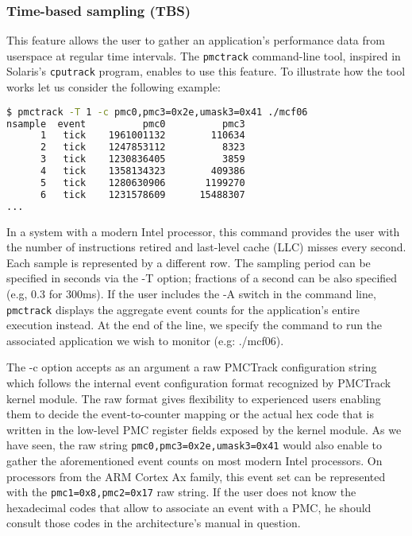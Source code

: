 \subsubsection{Time-based sampling (TBS)}\label{time-based-sampling-tbs}

This feature allows the user to gather an application's performance data
from userspace at regular time intervals. The \texttt{pmctrack}
command-line tool, inspired in Solaris's \texttt{cputrack} program,
enables to use this feature. To illustrate how the tool works let us
consider the following example:

\begin{lstlisting}[language=bash,basicstyle=\tt\scriptsize]
$ pmctrack -T 1 -c pmc0,pmc3=0x2e,umask3=0x41 ./mcf06
nsample  event          pmc0          pmc3
      1   tick    1961001132        110634
      2   tick    1247853112          8323
      3   tick    1230836405          3859
      4   tick    1358134323        409386
      5   tick    1280630906       1199270
      6   tick    1231578609      15488307
...
\end{lstlisting}

In a system with a modern Intel processor, this command provides the
user with the number of instructions retired and last-level cache (LLC)
misses every second. Each sample is represented by a different row. The
sampling period can be specified in seconds via the -T option; fractions
of a second can be also specified (e.g, 0.3 for 300ms). If the user
includes the -A switch in the command line, \texttt{pmctrack} displays
the aggregate event counts for the application's entire execution
instead. At the end of the line, we specify the command to run the
associated application we wish to monitor (e.g: ./mcf06).

The -c option accepts as an argument a raw PMCTrack configuration string
which follows the internal event configuration format recognized by
PMCTrack kernel module. The raw format gives flexibility to experienced
users enabling them to decide the event-to-counter mapping or the actual
hex code that is written in the low-level PMC register fields exposed by
the kernel module. As we have seen, the raw string
\texttt{pmc0,pmc3=0x2e,umask3=0x41} would also enable to gather the
aforementioned event counts on most modern Intel processors. On
processors from the ARM Cortex Ax family, this event set can be
represented with the \texttt{pmc1=0x8,pmc2=0x17} raw string. If the user
does not know the hexadecimal codes that allow to associate an event
with a PMC, he should consult those codes in the architecture's manual
in question.

